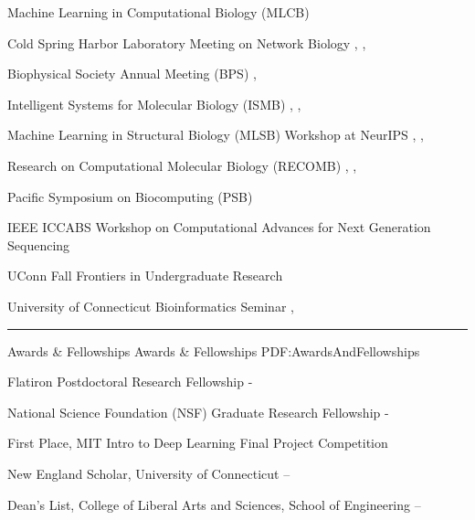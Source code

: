 \documentclass[letterpaper,MMMyyyy,nonstopmode]{simpleresumecv}
\begin{document}
\begin{Body}
\Entry
{Machine Learning in Computational Biology (MLCB)}
\hfill
{}
\Gap

\Entry
{Cold Spring Harbor Laboratory Meeting on Network Biology}
\hfill
{}, , 
\Gap

\Entry
{Biophysical Society Annual Meeting (BPS)}
\hfill
{}, 
\Gap

\Entry
{Intelligent Systems for Molecular Biology (ISMB)}
\hfill
{}, , 
\Gap

\Entry
{Machine Learning in Structural Biology (MLSB) Workshop at NeurIPS}
\hfill
{}, , 
\Gap

\Entry
{Research on Computational Molecular Biology (RECOMB)}
\hfill
{}, , 
\Gap

\Entry
{Pacific Symposium on Biocomputing (PSB)}
\hfill
{}
\Gap

\Entry
{IEEE ICCABS Workshop on Computational Advances for Next Generation Sequencing}
\hfill
{}
\Gap

\Entry
{UConn Fall Frontiers in Undergraduate Research}
\hfill
{}
\Gap

\Entry
{University of Connecticut Bioinformatics Seminar}
\hfill
{}, 

\BigGap
\hrule
\Section
{Awards \&\newline
Fellowships}
{Awards \& Fellowships}
{PDF:AwardsAndFellowships}

\Entry
{Flatiron Postdoctoral Research Fellowship}
\hfill
{} - 
\Gap

\Entry
{National Science Foundation (NSF) Graduate Research Fellowship}
\hfill
{} - 
\Gap

\Entry
{First Place, MIT Intro to Deep Learning Final Project Competition}
\hfill
{}
\Gap

\Entry
{New England Scholar, University of Connecticut}
\hfill
{} -- 
\Gap

\Entry
{Dean's List, College of Liberal Arts and Sciences, School of Engineering}
\hfill
{} --
\Gap


\end{Body}
\end{document}
